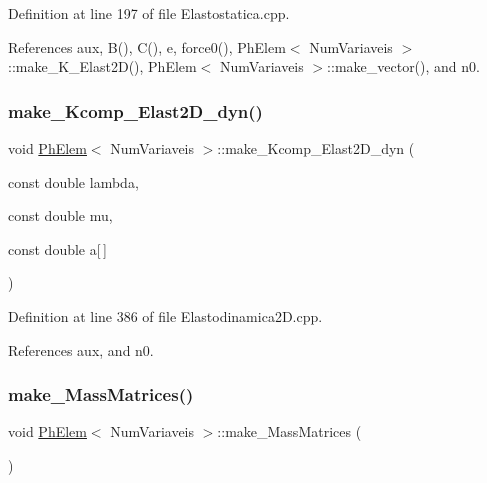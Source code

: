Definition at line 197 of file Elastostatica.\+cpp.



References aux, B(), C(), e, force0(), Ph\+Elem$<$ Num\+Variaveis $>$\+::make\+\_\+\+K\+\_\+\+Elast2\+D(), Ph\+Elem$<$ Num\+Variaveis $>$\+::make\+\_\+vector(), and n0.

\mbox{\label{classPhElem_a1ce74128a48a212028f644a68ce8edc0}} 
\subsubsection{\texorpdfstring{make\+\_\+\+Kcomp\+\_\+\+Elast2\+D\+\_\+dyn()}{make\_Kcomp\_Elast2D\_dyn()}}
{\footnotesize\ttfamily void \hyperlink{classPhElem}{Ph\+Elem}$<$ Num\+Variaveis $>$\+::make\+\_\+\+Kcomp\+\_\+\+Elast2\+D\+\_\+dyn (\begin{DoxyParamCaption}\item[{const double}]{lambda,  }\item[{const double}]{mu,  }\item[{const double}]{a\mbox{[}$\,$\mbox{]} }\end{DoxyParamCaption})\hspace{0.3cm}{\ttfamily [inherited]}}



Definition at line 386 of file Elastodinamica2\+D.\+cpp.



References aux, and n0.

\mbox{\label{classPhElem_ae538fb941f4cedc88e27dd28f2460bb5}} 
\subsubsection{\texorpdfstring{make\+\_\+\+Mass\+Matrices()}{make\_MassMatrices()}}
{\footnotesize\ttfamily void \hyperlink{classPhElem}{Ph\+Elem}$<$ Num\+Variaveis $>$\+::make\+\_\+\+Mass\+Matrices (\begin{DoxyParamCaption}{ }\end{DoxyParamCaption})\hspace{0.3cm}{\ttfamily [inherited]}}


